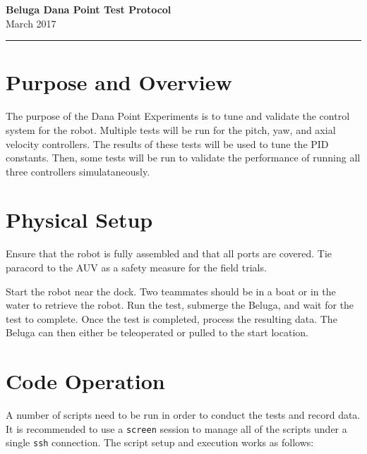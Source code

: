 \documentclass{article}
\begin{document}
\begin{center}
{\bf \Large Beluga Dana Point Test Protocol} \\  March 2017 \\
\rule{\textwidth}{1pt}
\end{center}

\section*{Purpose and Overview}
The purpose of the Dana Point Experiments is to tune and validate the control system for the robot. Multiple tests will be run for the pitch, yaw, and axial velocity controllers. The results of these tests will be used to tune the PID constants. Then, some tests will be run to validate the performance of running all three controllers simulataneously.

\section*{Physical Setup}
Ensure that the robot is fully assembled and that all ports are covered. Tie paracord to the AUV as a safety measure for the field trials.

Start the robot near the dock. Two teammates should be in a boat or in the water to retrieve the robot. Run the test, submerge the Beluga, and wait for the test to complete. Once the test is completed, process the resulting data. The Beluga can then either be teleoperated or pulled to the start location.

\section*{Code Operation}
A number of scripts need to be run in order to conduct the tests and record data.
It is recommended to use a \texttt{screen} session to manage all of the scripts under a single \texttt{ssh} connection.
The script setup and execution works as follows:
\end{document}
